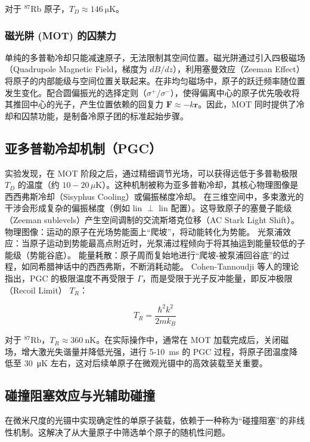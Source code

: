 \documentclass[../main.tex]{subfiles}
\begin{document}
对于 $^{87}\text{Rb}$ 原子，$T_D \approx \SI{146}{\micro\K}$。

\subsubsection{磁光阱 (MOT) 的囚禁力}
单纯的多普勒冷却只能减速原子，无法限制其空间位置。磁光阱通过引入四极磁场（Quadrupole Magnetic Field，梯度为 $dB/dz$），利用塞曼效应（Zeeman Effect）将原子的内部能级与空间位置关联起来。在非均匀磁场中，原子的跃迁频率随位置发生变化。配合圆偏振光的选择定则（$\sigma^+ / \sigma^-$），使得偏离中心的原子优先吸收将其推回中心的光子，产生位置依赖的回复力 $\mathbf{F} \approx -k \mathbf{r}$。因此，MOT 同时提供了冷却和囚禁功能，是制备冷原子团的标准起始步骤。


\subsection{亚多普勒冷却机制（PGC）}
实验发现，在 MOT 阶段之后，通过精细调节光场，可以获得远低于多普勒极限 $T_D$ 的温度（约 $10-20 \, \mu\text{K}$）。这种机制被称为亚多普勒冷却，其核心物理图像是西西弗斯冷却（Sisyphus Cooling）或偏振梯度冷却。
在三维空间中，多束激光的干涉会形成复杂的偏振梯度（例如 lin $\perp$ lin 配置）。这导致原子的塞曼子能级（Zeeman sublevels）产生空间调制的交流斯塔克位移（AC Stark Light Shift）。
物理图像：运动的原子在光场势能面上“爬坡”，将动能转化为势能。
光泵浦效应：当原子运动到势能最高点附近时，光泵浦过程倾向于将其抽运到能量较低的子能级（势能谷底）。
能量耗散：原子周而复始地进行“爬坡-被泵浦回谷底”的过程，如同希腊神话中的西西弗斯，不断消耗动能。
Cohen-Tannoudji 等人的理论指出，PGC 的极限温度不再受限于 $\Gamma$，而是受限于光子反冲能量，即反冲极限（Recoil Limit） $T_R$：

\begin{equation}
T_R = \frac{\hbar^2 k^2}{2mk_B}
\end{equation}

对于 $^{87}\text{Rb}$，$T_R \approx \SI{360}{\nano\K}$。在实际操作中，通常在 MOT 加载完成后，关闭磁场，增大激光失谐量并降低光强，进行 5-\SI{10}{\ms} 的 PGC 过程，将原子团温度降低至 \SI{30}{\micro\K} 左右，这对后续单原子在微观光镊中的高效装载至关重要。

\subsection{碰撞阻塞效应与光辅助碰撞}

在微米尺度的光镊中实现确定性的单原子装载，依赖于一种称为“碰撞阻塞”的非线性机制。这解决了从大量原子中筛选单个原子的随机性问题。
\end{document}
